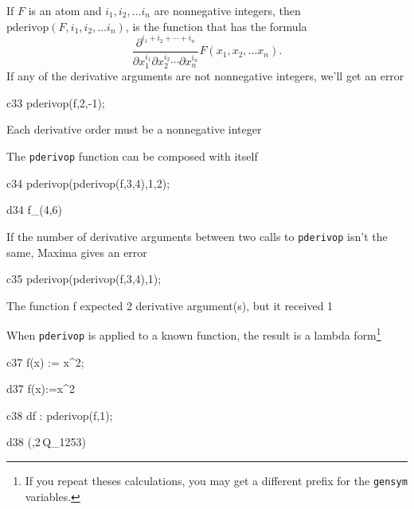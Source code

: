 \documentclass[12pt]{article}
\begin{document}
If $F$ is an atom and $i_1, i_2, \dots i_n$ are nonnegative
integers, then $ \mbox{pderivop}(F,i_1,i_2, \dots i_n)$, is the 
function that has the formula 
\[
   \frac{\partial^{i_1 + i_2 + \cdots + i_n}}{\partial x_1^{i_1} 
     \partial x_2^{i_2}  \cdots \partial x_n^{i_n}} F(x_1,x_2, \dots x_n). 
\]
If any of the derivative arguments are not nonnegative integers,
we'll get an error


\begin{mcline}{c33}
     pderivop(f,2,-1);
\end{mcline}

Each derivative order must be a nonnegative integer


\noindent The {\tt pderivop} function can be composed with itself

\begin{mcline}{c34}
     pderivop(pderivop(f,3,4),1,2);
\end{mcline}



\begin{mdline}{d34}
   f_{\left(4,6\right)}
\end{mdline}
\noindent If the number of derivative arguments between two calls 
to {\tt pderivop} isn't the same, Maxima gives an error

\begin{mcline}{c35}
     pderivop(pderivop(f,3,4),1);
\end{mcline}

The function f expected 2 derivative argument(s), but it received 1


When {\tt pderivop} is applied to a known function, the result is
a lambda form\footnote{If you repeat theses calculations, you 
may get a different prefix for the {\tt gensym} variables.}

\begin{mcline}{c37}
      f(x) := x^2;
\end{mcline}



\begin{mdline}{d37}
   f\left(x\right):=x^2
\end{mdline}

\begin{mcline}{c38}
   df : pderivop(f,1);
\end{mcline}



\begin{mdline}{d38}
   \lambda\left(\left[ Q_{1253} \right] ,2\,Q_{1253}\right)
\end{mdline}
\end{document}
